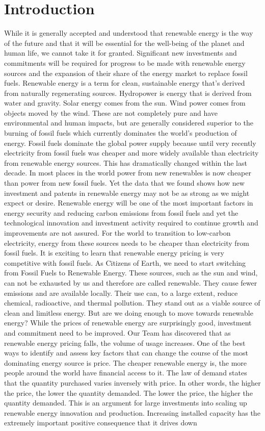 \documentclass[10pt,twocolumn,letterpaper]{article}
\begin{document}
\section{Introduction}
While it is generally accepted and understood that renewable energy is the way of the future and that it will be essential for the well-being of the planet and human life, we cannot take it for granted. Significant new investments and commitments will be required for progress to be made with renewable energy sources and the expansion of their share of the energy market to replace fossil fuels. Renewable energy is a term for clean, sustainable energy that's derived from naturally regenerating sources. Hydropower is energy that is derived from water and gravity. Solar energy comes from the sun. Wind power comes from objects moved by the wind. These are not completely pure and have environmental and human impacts, but are generally considered superior to the burning of fossil fuels which currently dominates the world’s production of energy. Fossil fuels dominate the global power supply because until very recently electricity from fossil fuels was cheaper and more widely available than electricity from renewable energy sources. This has dramatically changed within the last decade. In most places in the world power from new renewables is now cheaper than power from new fossil fuels. Yet the data that we found shows how new investment and patents in renewable energy may not be as strong as we might expect or desire. Renewable energy will be one of the most important factors in energy security and reducing carbon emissions from fossil fuels and yet the technological innovation and investment activity required to continue growth and improvements are not assured. For the world to transition to low-carbon electricity, energy from these sources needs to be cheaper than electricity from fossil fuels. It is exciting to learn that renewable energy pricing is very competitive with fossil fuels. As Citizens of Earth, we need to start switching from Fossil Fuels to Renewable Energy. These sources, such as the sun and wind, can not be exhausted by us and therefore are called renewable. They cause fewer emissions and are available locally. Their use can, to a large extent, reduce chemical, radioactive, and thermal pollution. They stand out as a viable source of clean and limitless energy. But are we doing enough to move towards renewable energy? While the prices of renewable energy are surprisingly good, investment and commitment need to be improved.  Our Team has discovered that as renewable energy pricing falls, the volume of usage increases. One of the best ways to identify and assess key factors that can change the course of the most dominating energy source is price. The cheaper renewable energy is, the more people around the world have financial access to it. The law of demand states that the quantity purchased varies inversely with price. In other words, the higher the price, the lower the quantity demanded. The lower the price, the higher the quantity demanded. This is an argument for large investments into scaling up renewable energy innovation and production. Increasing installed capacity has the extremely important positive consequence that it drives down 
\end{document}
